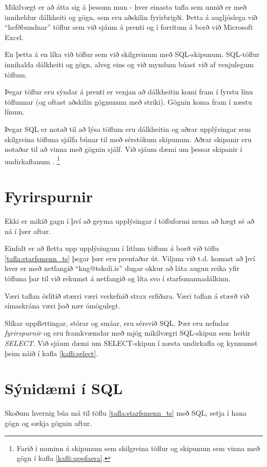 Mikilvægt er að átta sig á þessum mun - hver einasta tafla sem unnið er með inniheldur dálkheiti og gögn, sem eru aðskilin fyrirbrigði. Þetta á augljóslega við ``hefðbundnar'' töflur sem við sjáum á prenti og í forritum á borð við Microsoft Excel. 

En þetta á en líka við töflur sem við skilgreinum með SQL-skipunum. SQL-töflur innihalda dálkheiti og gögn, alveg eins og við myndum búast við af venjulegum töflum.

Þegar töflur eru sýndar á prenti er venjan að dálkheitin komi fram í fyrstu línu töflunnar (og oftast aðskilin gögnunum með striki). Gögnin koma fram í næstu línum.

Þegar SQL er notað til að lýsa töflum eru dálkheitin og aðrar upplýsingar sem skilgreina töfluna sjálfa búnar til með sérstökum skipunum. Aðrar skipanir eru notaðar til að vinna með gögnin sjálf. Við sjáum dæmi um þessar skipanir í undirkaflanum . \footnote{Farið í muninn á skipunum sem skilgreina töflur og skipunum sem vinna með gögn í kafla \ref{kafli:uppfaera}.}
\section{Fyrirspurnir}
Ekki er mikið gagn í því að geyma upplýsingar í töfluformi nema að hægt sé að ná í þær aftur.

Einfalt er að fletta upp upplýsingum í litlum töflum á borð við töflu \ref{tafla:starfsmenn_ts} þegar þær eru prentaðar út. Viljum við t.d. komast að því hver er með netfangið ``kng@tskoli.is'' dugar okkur að láta augun reika yfir töfluna þar til við rekumst á netfangið og líta svo í starfsmannadálkinn.

Væri taflan örlítið stærri væri verkefnið strax erfiðara. Væri taflan á stærð við símaskrána væri það nær ómögulegt.

Slíkar uppflettingar, stórar og smáar, eru sérsvið SQL. Þær eru nefndar \emph{fyrirspurnir} og eru framkvæmdar með mjög mikilvægri SQL-skipun sem heitir \emph{SELECT}. Við sjáum dæmi um SELECT-skipun í næsta undirkafla og kynnumst þeim náið í kafla \ref{kafli:select}.

\section{Sýnidæmi í SQL}
\label{undirkafli:synidaemi_i_sql}
Skoðum hvernig búa má til töflu \ref{tafla:starfsmenn_ts} með SQL, setja í hana gögn og sækja gögnin aftur. 


